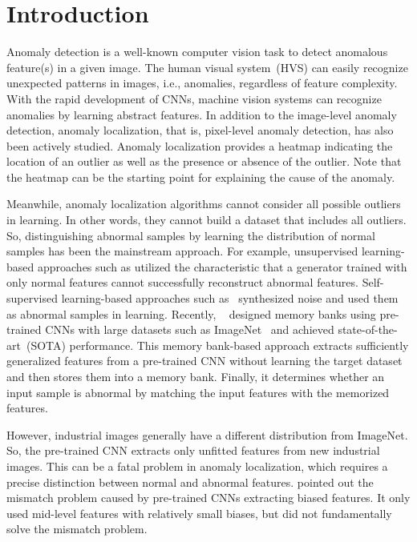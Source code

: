 \documentclass[10pt,twocolumn,letterpaper]{article}
\begin{document}
\section{Introduction}
\label{sec:introduction}
    Anomaly detection is a well-known computer vision task to detect anomalous feature(s) in a given image. The human visual system~(HVS) can easily recognize unexpected patterns in images, i.e., anomalies, regardless of feature complexity. With the rapid development of CNNs, machine vision systems can recognize anomalies by learning abstract features. In addition to the image-level anomaly detection, anomaly localization, that is, pixel-level anomaly detection, has also been actively studied. Anomaly localization provides a heatmap indicating the location of an outlier as well as the presence or absence of the outlier. Note that the heatmap can be the starting point for explaining the cause of the anomaly.
    
    Meanwhile, anomaly localization algorithms cannot consider all possible outliers in learning. In other words, they cannot build a dataset that includes all outliers. So, distinguishing abnormal samples by learning the distribution of normal samples has been the mainstream approach. For example, unsupervised learning-based approaches such as \cite{SSIM-AD,anogan} utilized the characteristic that a generator trained with only normal features cannot successfully reconstruct abnormal features. Self-supervised learning-based approaches such as~\cite{cutpaste,anoseg,patchSVDD} synthesized noise and used them as abnormal samples in learning. Recently, ~\cite{SPADE,PaDiM,PatchCore} designed memory banks using pre-trained CNNs with large datasets such as ImageNet~\cite{imagenet} and achieved state-of-the-art~(SOTA) performance. This memory bank-based approach extracts sufficiently generalized features from a pre-trained CNN without learning the target dataset and then stores them into a memory bank. Finally, it determines whether an input sample is abnormal by matching the input features with the memorized features.
    
    However, industrial images generally have a different distribution from ImageNet. So, the pre-trained CNN extracts only unfitted features from new industrial images. This can be a fatal problem in anomaly localization, which requires a precise distinction between normal and abnormal features. \cite{PatchCore} pointed out the mismatch problem caused by pre-trained CNNs extracting biased features. It only used mid-level features with relatively small biases, but did not fundamentally solve the mismatch problem.
    
\end{document}
